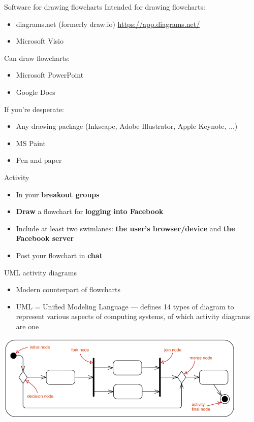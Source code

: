 \begin{frame}{Software for drawing flowcharts}
	\pause Intended for drawing flowcharts:
	\begin{itemize}
		\item diagrams.net (formerly draw.io) \url{https://app.diagrams.net/}
		\item Microsoft Visio
	\end{itemize}
	\pause Can draw flowcharts:
	\begin{itemize}
		\item Microsoft PowerPoint
		\item Google Docs
	\end{itemize}
	\pause If you're desperate:
	\begin{itemize}
		\item Any drawing package (Inkscape, Adobe Illustrator, Apple Keynote, ...)
		\item MS Paint
		\item Pen and paper
	\end{itemize}
\end{frame}

\begin{frame}{Activity}
	\begin{itemize}
		\item In your \textbf{breakout groups}
		\item \textbf{Draw} a flowchart for \textbf{logging into Facebook}
		\item Include at least two swimlanes: \textbf{the user's browser/device} and \textbf{the Facebook server}
		\item Post your flowchart in \textbf{chat}
	\end{itemize}
\end{frame}

\begin{frame}{UML activity diagrams}
	\begin{itemize}
		\pause\item Modern counterpart of flowcharts
		\pause\item UML = Unified Modeling Language --- defines 14 types of diagram to represent various aspects of computing systems, of which activity diagrams are one
	\end{itemize}
	\pause
	\begin{center}
		\includegraphics[width=0.9\textwidth]{uml_symbols}
	\end{center}
\end{frame}

